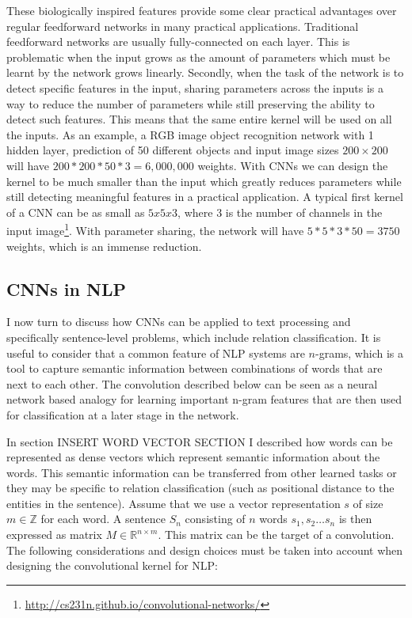 These biologically inspired features provide some clear practical advantages over regular feedforward networks in many practical applications. 
Traditional feedforward networks are usually fully-connected on each layer. This is problematic when the input grows as the amount of parameters which must be learnt by the network grows linearly. Secondly, when the task of the network is to detect specific features in the input, sharing parameters across the inputs is a way to reduce the number of parameters while still preserving the ability to detect such features. This means that the same entire kernel will be used on all the inputs. 
As an example, a RGB image object recognition network with 1 hidden layer, prediction of 50 different objects and input image sizes $200 \times 200$ will have $200 * 200 * 50 * 3 = 6,000,000$ weights.    
With CNNs we can design the kernel to be much smaller than the input which greatly reduces parameters while still detecting meaningful features in a practical application. A typical first kernel of a CNN can be as small as $5x5x3$, where 3 is the number of channels in the input image\footnote{\url{http://cs231n.github.io/convolutional-networks/}}. With parameter sharing, the network will have $5*5*3*50 = 3750$ weights, which is an immense reduction. 




\subsection{CNNs in NLP}

I now turn to discuss how CNNs can be applied to text processing and specifically sentence-level problems, which include relation classification. It is useful to consider that a common feature of NLP systems are $n$-grams, which is a tool to capture semantic information between combinations of words that are next to each other. The convolution described below can be seen as a neural network based analogy for learning important n-gram features that are then used for classification at a later stage in the network. 

In section INSERT WORD VECTOR SECTION I described how words can be represented as dense vectors which represent semantic information about the words. This semantic information can be transferred from other learned tasks or they may be specific to relation classification (such as positional distance to the entities in the sentence).
Assume that we use a vector representation $s$ of size $m \in \mathbb{Z}$ for each word.
A sentence $S_n$ consisting of $n$ words $s_1, s_2 \ldots s_n$ is then expressed as matrix $M \in \mathbb{R}^{n \times m}$. This matrix can be the target of a convolution. The following considerations and design choices must be taken into account when designing the convolutional kernel for NLP:

